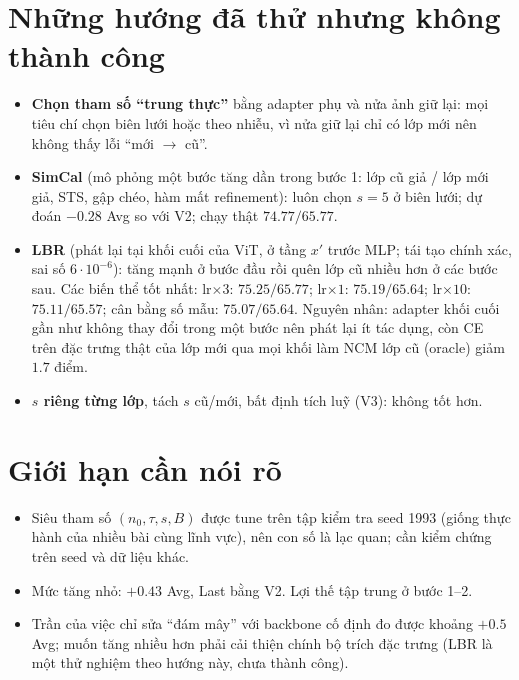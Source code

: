 \documentclass[11pt]{article}
\begin{document}
\section{Những hướng đã thử nhưng không thành công}
\begin{itemize}
\item \textbf{Chọn tham số ``trung thực''} bằng adapter phụ và nửa ảnh giữ lại: mọi tiêu chí chọn biên lưới hoặc theo
      nhiễu, vì nửa giữ lại chỉ có lớp mới nên không thấy lỗi ``mới $\to$ cũ''.
\item \textbf{SimCal} (mô phỏng một bước tăng dần trong bước 1: lớp cũ giả / lớp mới giả, STS, gập chéo, hàm mất
      refinement): luôn chọn $s=5$ ở biên lưới; dự đoán $-0.28$ Avg so với V2; chạy thật $74.77/65.77$.
\item \textbf{LBR} (phát lại tại khối cuối của ViT, ở tầng $x'$ trước MLP; tái tạo chính xác, sai số $6\cdot10^{-6}$):
      tăng mạnh ở bước đầu rồi quên lớp cũ nhiều hơn ở các bước sau. Các biến thể tốt nhất: lr$\times3$:
      $75.25/65.77$; lr$\times1$: $75.19/65.64$; lr$\times10$: $75.11/65.57$; cân bằng số mẫu: $75.07/65.64$. Nguyên
      nhân: adapter khối cuối gần như không thay đổi trong một bước nên phát lại ít tác dụng, còn CE trên đặc trưng
      thật của lớp mới qua mọi khối làm NCM lớp cũ (oracle) giảm $1.7$ điểm.
\item \textbf{$s$ riêng từng lớp}, tách $s$ cũ/mới, bất định tích luỹ (V3): không tốt hơn.
\end{itemize}

\section{Giới hạn cần nói rõ}
\begin{itemize}
\item Siêu tham số $(n_0,\tau,s,B)$ được tune trên tập kiểm tra seed 1993 (giống thực hành của nhiều bài cùng lĩnh
      vực), nên con số là lạc quan; cần kiểm chứng trên seed và dữ liệu khác.
\item Mức tăng nhỏ: $+0.43$ Avg, Last bằng V2. Lợi thế tập trung ở bước 1--2.
\item Trần của việc chỉ sửa ``đám mây'' với backbone cố định đo được khoảng $+0.5$ Avg; muốn tăng nhiều hơn phải cải
      thiện chính bộ trích đặc trưng (LBR là một thử nghiệm theo hướng này, chưa thành công).
\end{itemize}
\end{document}
